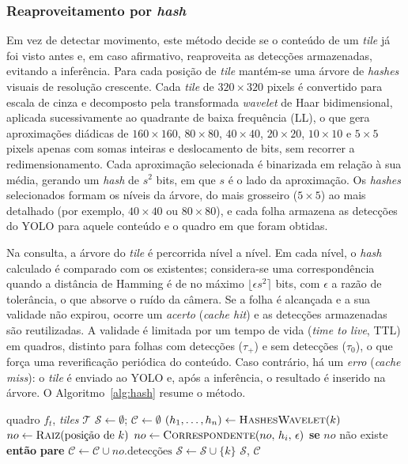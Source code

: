 \documentclass{ieeeaccess}
\begin{document}
\subsubsection{Reaproveitamento por \textit{hash}}
Em vez de detectar movimento, este método decide se o conteúdo de um \textit{tile} já foi visto antes e, em caso afirmativo, reaproveita as detecções armazenadas, evitando a inferência. Para cada posição de \textit{tile} mantém-se uma árvore de \textit{hashes} visuais de resolução crescente. Cada \textit{tile} de $320\times320$ pixels é convertido para escala de cinza e decomposto pela transformada \textit{wavelet} de Haar bidimensional, aplicada sucessivamente ao quadrante de baixa frequência (LL), o que gera aproximações diádicas de $160\times160$, $80\times80$, $40\times40$, $20\times20$, $10\times10$ e $5\times5$ pixels apenas com somas inteiras e deslocamento de bits, sem recorrer a redimensionamento. Cada aproximação selecionada é binarizada em relação à sua média, gerando um \textit{hash} de $s^2$ bits, em que $s$ é o lado da aproximação. Os \textit{hashes} selecionados formam os níveis da árvore, do mais grosseiro ($5\times5$) ao mais detalhado (por exemplo, $40\times40$ ou $80\times80$), e cada folha armazena as detecções do YOLO para aquele conteúdo e o quadro em que foram obtidas.

Na consulta, a árvore do \textit{tile} é percorrida nível a nível. Em cada nível, o \textit{hash} calculado é comparado com os existentes; considera-se uma correspondência quando a distância de Hamming é de no máximo $\lfloor \epsilon s^2 \rceil$ bits, com $\epsilon$ a razão de tolerância, o que absorve o ruído da câmera. Se a folha é alcançada e a sua validade não expirou, ocorre um \textit{acerto} (\textit{cache hit}) e as detecções armazenadas são reutilizadas. A validade é limitada por um tempo de vida (\textit{time to live}, TTL) em quadros, distinto para folhas com detecções ($\tau_{+}$) e sem detecções ($\tau_{0}$), o que força uma reverificação periódica do conteúdo. Caso contrário, há um \textit{erro} (\textit{cache miss}): o \textit{tile} é enviado ao YOLO e, após a inferência, o resultado é inserido na árvore. O Algoritmo~\ref{alg:hash} resume o método.

\begin{algorithm}[t]
\caption{Decisão por \textit{hash} em árvore}
\label{alg:hash}
\begin{algorithmic}[1]
\REQUIRE quadro $f_t$, \textit{tiles} $\mathcal{T}$
\STATE $\mathcal{S} \gets \emptyset$; $\mathcal{C} \gets \emptyset$
  \STATE $(h_1,\ldots,h_n) \gets \textsc{HashesWavelet}(k)$
  \STATE $no \gets \textsc{Raiz}(\text{posição de } k)$
    \STATE $no \gets \textsc{Correspondente}(no,\, h_i,\, \epsilon)$
    \STATE \textbf{se} $no$ não existe \textbf{então} \textbf{pare}
  \ENDFOR
    \STATE $\mathcal{C} \gets \mathcal{C} \cup no.\text{detecções}$ 
  \ELSE
    \STATE $\mathcal{S} \gets \mathcal{S} \cup \{k\}$ 
  \ENDIF
\ENDFOR
\RETURN $\mathcal{S}$, $\mathcal{C}$
\end{algorithmic}
\end{algorithm}
\end{document}
